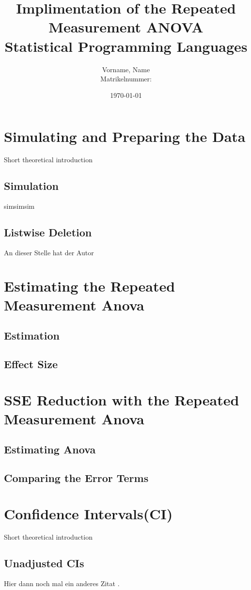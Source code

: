 \documentclass[11pt]{article}
\author{Vorname, Name\\Matrikelnummer: }
\title{\textbf{Implimentation of the Repeated Measurement ANOVA}\\ Statistical Programming Languages \\[5cm]}
\date{\today}
\begin{document}
	\maketitle
	\thispagestyle{fancy}
	\newpage
	\tableofcontents
	\newpage
	\section{Simulating and Preparing the Data}
	Short theoretical introduction
		\subsection{Simulation}
				 simsimsim
		\subsection{Listwise Deletion}
				 An dieser Stelle hat der Autor
				 
	\section{Estimating the Repeated Measurement Anova}
		\subsection{Estimation}
	
		\subsection{Effect Size}
	
	\section{SSE Reduction with the Repeated Measurement Anova}
		\subsection{Estimating Anova}
	
		\subsection{Comparing the Error Terms}
		
 
	\section{Confidence Intervals(CI)}
	Short theoretical introduction
		\subsection{Unadjusted CIs}
		Hier dann noch mal ein anderes Zitat \citep{003}.
\end{document}
